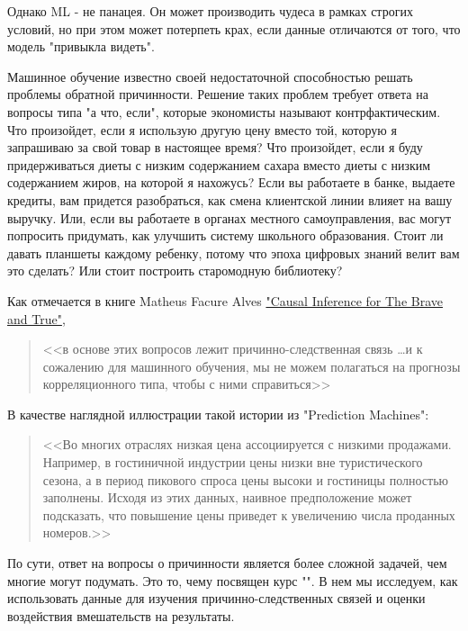         Однако ML - не панацея.
        Он может производить чудеса в рамках строгих условий, но при этом может потерпеть крах, если данные отличаются от того, что модель "привыкла видеть".

        Машинное обучение известно своей недостаточной способностью решать проблемы обратной причинности.
        Решение таких проблем требует ответа на вопросы типа "а что, если"{}, которые экономисты называют контрфактическим.
        Что произойдет, если я использую другую цену вместо той, которую я запрашиваю за свой товар в настоящее время?
        Что произойдет, если я буду придерживаться диеты с низким содержанием сахара вместо диеты с низким содержанием жиров, на которой я нахожусь?
        Если вы работаете в банке, выдаете кредиты, вам придется разобраться, как смена клиентской линии влияет на вашу выручку.
        Или, если вы работаете в органах местного самоуправления, вас могут попросить придумать, как улучшить систему школьного образования.
        Стоит ли давать планшеты каждому ребенку, потому что эпоха цифровых знаний велит вам это сделать?
        Или стоит построить старомодную библиотеку?

        Как отмечается в книге Matheus Facure Alves \href{https://matheusfacure.github.io/python-causality-handbook/landing-page.html}{"Causal Inference for The Brave and True"}{},
        \begin{quote}
            <<в основе этих вопросов лежит причинно-следственная связь \ldots и к сожалению для машинного обучения, мы не можем полагаться на прогнозы корреляционного типа, чтобы с ними справиться>>
        \end{quote}
        В качестве наглядной иллюстрации такой истории из "Prediction Machines":
        \begin{quote}
            <<Во многих отраслях низкая цена ассоциируется с низкими продажами.
            Например, в гостиничной индустрии цены низки вне туристического сезона, а в период пикового спроса цены высоки и гостиницы полностью заполнены.
            Исходя из этих данных, наивное предположение может подсказать, что повышение цены приведет к увеличению числа проданных номеров.>>
        \end{quote}

        По сути, ответ на вопросы о причинности является более сложной задачей, чем многие могут подумать.
        Это то, чему посвящен курс "\coursename".
        В нем мы исследуем, как использовать данные для изучения причинно-следственных связей и оценки воздействия вмешательств на результаты.

